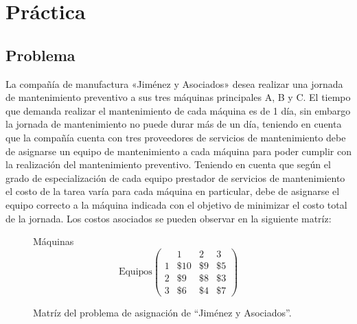 \documentclass[letterpaper, 12pt]{article}
\begin{document}
    \section{Práctica}
    \subsection{Problema}
    La compañía de manufactura «Jiménez y Asociados» desea realizar una jornada de mantenimiento preventivo a sus tres máquinas principales A, B y C. El tiempo que demanda realizar 
    el mantenimiento de cada máquina es de 1 día, sin embargo la jornada de mantenimiento no puede durar más de un día, teniendo en cuenta que la compañía cuenta con tres proveedores de servicios de mantenimiento debe de
    asignarse un equipo de mantenimiento a cada máquina para poder cumplir con la realización del mantenimiento preventivo. Teniendo en cuenta que según el grado de especialización de cada equipo prestador de servicios de mantenimiento el costo de la tarea varía para cada máquina en particular, 
    debe de asignarse el equipo correcto a la máquina indicada con el objetivo de minimizar el costo total de la jornada. Los costos asociados se pueden observar en la siguiente matríz:
    \begin{figure}[H]
        \centering
        Máquinas
        \[\text{Equipos}\begin{pmatrix}
             &1&2&3\\
            1&\$10&\$9&\$5\\
            2&\$9&\$8&\$3\\
            3&\$6&\$4&\$7
        \end{pmatrix}\]
        \caption{Matríz del problema de asignación de ``Jiménez y Asociados''.}
        \label{fig:matrixprob}
    \end{figure}
\end{document}
